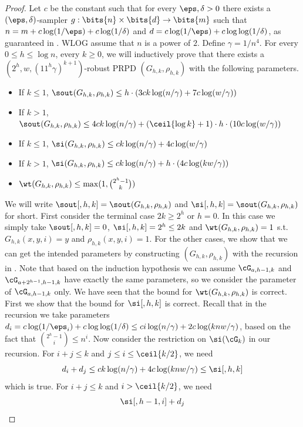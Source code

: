 \begin{proof}
Let $c$ be the constant such that for every $\eps,\delta>0$ there exists a $(\eps,\delta)$-sampler $g:\bits{n}\times\bits{d}\to\bits{m}$ such that $n=m+c\log(1/\eps)+c\log(1/\delta)$ and $d=c\log (1/\eps)+c\log\log(1/\delta)$, as guaranteed in . WLOG assume that $n$ is a power of $2$. Define $\gamma=1/n^{4}$. For every $0\le h \le \log n$, every $k\ge 0$, we will inductively prove that there exists a $(2^h,w,(11^h\gamma)^{k+1})$-robust PRPD $(G_{h,k},\rho_{h,k})$ with the following parameters.
\begin{itemize}
\item
If $k\le 1$, $\sout(G_{h,k},\rho_{h,k})\le h \cdot (3ck\log(n/\gamma) + 7c\log(w/\gamma))$
\item 
If $k>1$, $\sout(G_{h,k},\rho_{h,k})\le 4ck\log (n/\gamma)+(\ceil{\log k}+1)\cdot h \cdot (10c\log(w/\gamma))$
\item
If $k\le 1$, $\si(G_{h,k},\rho_{h,k})\le ck\log(n/\gamma) + 4c\log(w/\gamma)$
\item
If $k>1$, $\si(G_{h,k},\rho_{h,k})\le ck\log (n/\gamma)+ h \cdot (4c\log(kw/\gamma))$
\item
$\wt(G_{h,k},\rho_{h,k})\le \max(1,\binom{2^h-1}{k})$
\end{itemize}
We will write $\sout[,h,k]=\sout(G_{h,k},\rho_{h,k})$ and $\si[,h,k]=\sout(G_{h,k},\rho_{h,k})$ for short. First consider the terminal case $2k\ge 2^h$ or $h=0$. In this case we simply take $\sout[,h,k]=0$, $\si[,h,k]=2^h \le 2k$ and $\wt(G_{h,k},\rho_{h,k})=1$ s.t. $G_{h,k}(x,y,i)=y$ and $\rho_{h,k}(x,y,i)=1$. For the other cases, we show that we can get the intended parameters by constructing $(G_{h,k},\rho_{h,k})$ with the recursion in . Note that based on the induction hypothesis we can assume $\cG_{a,h-1,k}$ and $\cG_{a+2^{h-1},h-1,k}$ have exactly the same parameters, so we consider the parameter of $\cG_{a,h-1,k}$ only. We have seen that the bound for $\wt(G_{h,k},\rho_{h,k})$ is correct. First we show that the bound for $\si[,h,k]$ is correct. Recall that in the recursion we take parameters $d_i=c\log(1/\eps_i)+c\log\log(1/\delta)\le ci\log(n/\gamma)+2c\log(knw/\gamma)$, based on the fact that $\binom{2^h-1}{i}\le n^i$. Now consider the restriction on $\si(\cG_k)$ in our recursion. For $i+j\le k$ and $j\le i\le\ceil{k/2}$, we need 
$$d_i+d_j\le ck\log(n/\gamma)+4c\log(knw/\gamma)\le\si[,h,k]$$ which is true. For $i+j\le k$ and $i>\ceil{k/2}$, we need 
\begin{align*}
\si[,h-1,i]+d_j

\end{align*}
\end{proof}
